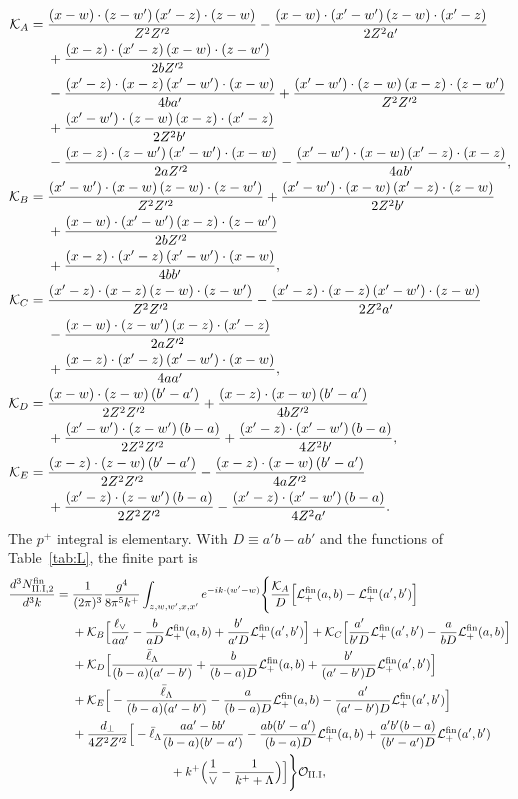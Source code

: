 \begin{align}
\mathcal{K}_A={}&\frac{(x-w)\cdot(z-w')\,(x'-z)\cdot(z-w)}{Z^2Z'^2}-\frac{(x-w)\cdot(x'-w')\,(z-w)\cdot(x'-z)}{2Z^2a'}\notag\\
&+\frac{(x-z)\cdot(x'-z)\,(x-w)\cdot(z-w')}{2bZ'^2}\notag\\
&-\frac{(x'-z)\cdot(x-z)\,(x'-w')\cdot(x-w)}{4ba'}+\frac{(x'-w')\cdot(z-w)\,(x-z)\cdot(z-w')}{Z^2Z'^2}\notag\\
&+\frac{(x'-w')\cdot(z-w)\,(x-z)\cdot(x'-z)}{2Z^2b'}\notag\\
&-\frac{(x-z)\cdot(z-w')\,(x'-w')\cdot(x-w)}{2aZ'^2}-\frac{(x'-w')\cdot(x-w)\,(x'-z)\cdot(x-z)}{4ab'},\notag\\
\mathcal{K}_B={}&\frac{(x'-w')\cdot(x-w)\,(z-w)\cdot(z-w')}{Z^2Z'^2}+\frac{(x'-w')\cdot(x-w)\,(x'-z)\cdot(z-w)}{2Z^2b'}\notag\\
&+\frac{(x-w)\cdot(x'-w')\,(x-z)\cdot(z-w')}{2bZ'^2}\notag\\
&+\frac{(x-z)\cdot(x'-z)\,(x'-w')\cdot(x-w)}{4bb'},\notag\\
\mathcal{K}_C={}&\frac{(x'-z)\cdot(x-z)\,(z-w)\cdot(z-w')}{Z^2Z'^2}-\frac{(x'-z)\cdot(x-z)\,(x'-w')\cdot(z-w)}{2Z^2a'}\notag\\
&-\frac{(x-w)\cdot(z-w')\,(x-z)\cdot(x'-z)}{2aZ'^2}\notag\\
&+\frac{(x-z)\cdot(x'-z)\,(x'-w')\cdot(x-w)}{4aa'},\notag\\
\mathcal{K}_D={}&\frac{(x-w)\cdot(z-w)\,(b'-a')}{2Z^2Z'^2}+\frac{(x-z)\cdot(x-w)\,(b'-a')}{4bZ'^2}\notag\\
&+\frac{(x'-w')\cdot(z-w')\,(b-a)}{2Z^2Z'^2}+\frac{(x'-z)\cdot(x'-w')\,(b-a)}{4Z^2b'},\notag\\
\mathcal{K}_E={}&\frac{(x-z)\cdot(z-w)\,(b'-a')}{2Z^2Z'^2}-\frac{(x-z)\cdot(x-w)\,(b'-a')}{4aZ'^2}\notag\\
&+\frac{(x'-z)\cdot(z-w')\,(b-a)}{2Z^2Z'^2}-\frac{(x'-z)\cdot(x'-w')\,(b-a)}{4Z^2a'}.
\label{eq:KAE}
\end{align}
The $p^+$ integral is elementary. With $D\equiv a'b-ab'$ and the functions of Table~\ref{tab:L}, the finite part is
\begin{align}
\frac{d^3N^{\rm fin}_{\rm II.I,2}}{d^3k}={}&\frac{1}{(2\pi)^3}\frac{g^4}{8\pi^5k^+}\int_{z,w,w',x,x'}e^{-ik\cdot(w'-w)}\Bigg\{\frac{\mathcal{K}_A}{D}\Big[\mathcal{L}_{+}^{\rm fin}(a,b)-\mathcal{L}_{+}^{\rm fin}(a',b')\Big]\notag\\
&+\mathcal{K}_B\Big[\frac{\ell_{\vee}}{aa'}-\frac{b}{aD}\mathcal{L}_{+}^{\rm fin}(a,b)+\frac{b'}{a'D}\mathcal{L}_{+}^{\rm fin}(a',b')\Big]+\mathcal{K}_C\Big[\frac{a'}{b'D}\mathcal{L}_{+}^{\rm fin}(a',b')-\frac{a}{bD}\mathcal{L}_{+}^{\rm fin}(a,b)\Big]\notag\\
&+\mathcal{K}_D\Big[\frac{\bar\ell_{\Lambda}}{(b-a)(a'-b')}+\frac{b}{(b-a)D}\mathcal{L}_{+}^{\rm fin}(a,b)+\frac{b'}{(a'-b')D}\mathcal{L}_{+}^{\rm fin}(a',b')\Big]\notag\\
&+\mathcal{K}_E\Big[-\frac{\bar\ell_{\Lambda}}{(b-a)(a'-b')}-\frac{a}{(b-a)D}\mathcal{L}_{+}^{\rm fin}(a,b)-\frac{a'}{(a'-b')D}\mathcal{L}_{+}^{\rm fin}(a',b')\Big]\notag\\
&+\frac{d_\perp}{4Z^2Z'^2}\Big[-\bar\ell_{\Lambda}\frac{aa'-bb'}{(b-a)(b'-a')}-\frac{ab(b'-a')}{(b-a)D}\mathcal{L}_{+}^{\rm fin}(a,b)+\frac{a'b'(b-a)}{(b'-a')D}\mathcal{L}_{+}^{\rm fin}(a',b')\notag\\
&\hspace{8em}+k^+\Big(\frac1\vee-\frac{1}{k^++\Lambda}\Big)\Big]\Bigg\}\mathcal{O}_{\rm II.I},
\label{eq:finGIIpart2}
\end{align}

